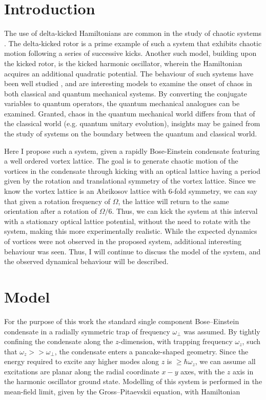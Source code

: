 \section{Introduction}

The use of delta-kicked Hamiltonians are common in the study of chaotic systems \cite{CT:Ullah_epjd_2012,CT:White_njp_2014}. The delta-kicked rotor is a prime example of such a system that exhibits chaotic motion following a series of successive kicks. Another such model, building upon the kicked rotor, is the kicked harmonic oscillator, wherein the Hamiltonian acquires an additional quadratic potential. The behaviour of such systems have been well studied \cite{CT:Berman_nonlin_1991, CT:Duffy_pra_2004}, and are interesting models to examine the onset of chaos in both classical and quantum mechanical systems. By converting the conjugate variables to quantum operators, the quantum mechanical analogues can be examined. Granted, chaos in the quantum mechanical world differs from that of the classical world (e.g. quantum unitary evolution), insights may be gained from the study of systems on the boundary between the quantum and classical world.

Here I propose such a system, given a rapidly Bose-Einstein condensate featuring a well ordered vortex lattice. The goal is to generate chaotic motion of the vortices in the condensate through kicking with an optical lattice having a period given by the rotation and translational symmetry of the vortex lattice. Since we know the vortex lattice is an Abrikosov lattice with 6-fold symmetry, we can say that given a rotation frequency of $\Omega$, the lattice will return to the same orientation after a rotation of $\Omega/6$. Thus, we can kick the system at this interval with a stationary optical lattice potential, without the need to rotate with the system, making this more experimentally realistic. While the expected dynamics of vortices were not observed in the proposed system, additional interesting behaviour was seen. Thus, I will continue to discuss the model of the system, and the observed dynamical behaviour will be described.

\section{Model}
For the purpose of this work the standard single component Bose--Einstein condensate in a radially symmetric trap of frequency $\omega_\perp$ was assumed. By tightly confining the condensate along the $z$-dimension, with trapping frequency $\omega_z$, such that $\omega_z >> \omega_\perp$, the condensate enters a pancake-shaped geometry. Since the energy required to excite any higher modes along $z$ is $\geq \hbar\omega_z$, we can assume all excitations are planar along the radial coordinate $x-y$ axes, with the $z$ axis in the harmonic oscillator ground state. Modelling of this system is performed in the mean-field limit, given by the Gross--Pitaevskii equation, with Hamiltonian

